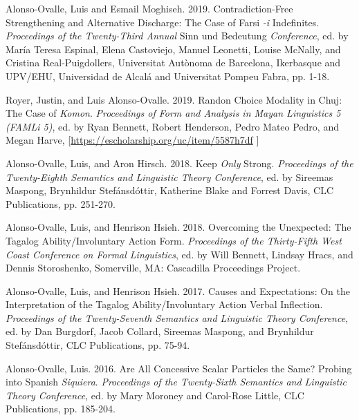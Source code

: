 \documentclass[11pt]{article}
\begin{document}
 Alonso-Ovalle, Luis and Esmail Moghiseh. 2019. Contradiction-Free Strengthening and Alternative Discharge: The Case of Farsi \textit{-i} Indefinites. \textit{Proceedings of the Twenty-Third Annual} Sinn und Bedeutung \textit{Conference}, ed. by Mar\'ia Teresa Espinal, Elena Castoviejo, Manuel Leonetti, Louise McNally, and Cristina Real-Puigdollers, Universitat Aut\`onoma de Barcelona, Ikerbasque and UPV/EHU, Universidad de Alcal\'a and Universitat Pompeu Fabra, pp. 1-18. %
      
 Royer, Justin, and Luis Alonso-Ovalle. 2019. Randon Choice Modality in Chuj: The Case of \textit{Komon}. \textit{Proceedings of Form and Analysis in Mayan Linguistics 5 (FAMLi 5)}, ed. by Ryan Bennett, Robert Henderson, Pedro Mateo Pedro, and Megan Harve, {\footnotesize [\href{https://escholarship.org/uc/item/5587h7df}{https://escholarship.org/uc/item/5587h7df} ]}
      
Alonso-Ovalle, Luis, and Aron Hirsch. 2018. Keep \textit{Only} Strong. \textit{Proceedings of the Twenty-Eighth Semantics and Linguistic Theory Conference}, ed. by Sireemas Maspong, Brynhildur Stef\'ansd\'ottir, Katherine Blake and Forrest Davis, CLC Publications, pp. 251-270. %
       
 Alonso-Ovalle, Luis, and Henrison Hsieh. 2018. Overcoming the Unexpected: The Tagalog Ability/Involuntary Action Form.  \textit{Proceedings of the Thirty-Fifth West Coast Conference on Formal Linguistics}, ed. by Will Bennett, Lindsay Hracs, and Dennis Storoshenko, Somerville, MA: Cascadilla Proceedings Project.      
      
 Alonso-Ovalle, Luis, and Henrison Hsieh. 2017. Causes and Expectations: On the Interpretation of the Tagalog Ability/Involuntary Action Verbal Inflection. \textit{Proceedings of the Twenty-Seventh Semantics and Linguistic Theory Conference}, ed. by Dan Burgdorf, Jacob Collard, Sireemas Maspong, and Brynhildur Stef\'ansd\'ottir, CLC Publications, pp. 75-94. %

Alonso-Ovalle, Luis. 2016. Are All Concessive Scalar Particles the Same? Probing into Spanish \textit{Siquiera}.  \textit{Proceedings of the Twenty-Sixth
  Semantics and Linguistic Theory Conference}, ed. by Mary Moroney and
Carol-Rose Little, CLC Publications, pp. 185-204. %
\end{document}
